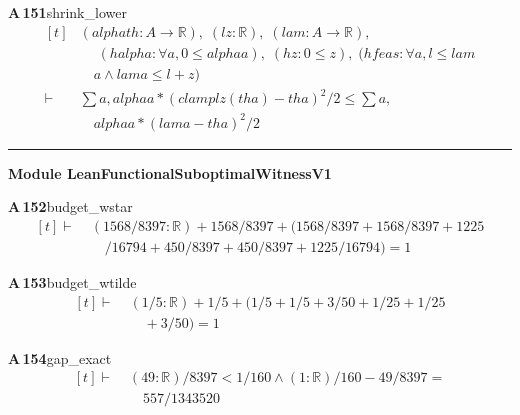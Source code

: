 \documentclass[conference]{IEEEtran}
\theoremstyle{definition}
\newcommand{\lean}[1]{\textsf{\footnotesize #1}}
\begin{document}
\noindent\textbf{A\,151}\quad\lean{shrink\_lower}
{\footnotesize\[ \begin{aligned}[t]
&(\mathit{alpha} \mathit{th} : \mathit{A} \to \mathbb{R} ),\; (\mathit{l} \mathit{z} : \mathbb{R} ),\; (\mathit{lam} : \mathit{A} \to \mathbb{R} ),\\
&\quad \; (\mathit{halpha} : \forall \mathit{a}, 0 \leq \mathit{alpha} \mathit{a}),\; (\mathit{hz} : 0 \leq \mathit{z}),\; (\mathit{hfeas} : \forall \mathit{a}, \mathit{l} \leq \mathit{lam}\\
&\quad \mathit{a} \wedge \mathit{lam} \mathit{a} \leq \mathit{l} + \mathit{z})\\
\vdash\;&\textstyle\sum \mathit{a}, \mathit{alpha} \mathit{a} * (\mathit{clamp} \mathit{l} \mathit{z} (\mathit{th} \mathit{a}) - \mathit{th} \mathit{a}) ^{2} / 2 \leq \textstyle\sum \mathit{a},\\
&\quad \mathit{alpha} \mathit{a} * (\mathit{lam} \mathit{a} - \mathit{th} \mathit{a}) ^{2} / 2
\end{aligned} \]}

\vspace{4pt}\noindent\rule{\columnwidth}{0.4pt}\par\vspace{2pt}
\noindent\textbf{Module \lean{LeanFunctionalSuboptimalWitnessV1}}\par\vspace{3pt}

\noindent\textbf{A\,152}\quad\lean{budget\_wstar}
{\footnotesize\[ \begin{aligned}[t]
\vdash\;&(1568/8397 : \mathbb{R} ) + 1568/8397 + (1568/8397 + 1568/8397 + 1225\\
&\quad /16794 + 450/8397 + 450/8397 + 1225/16794) = 1
\end{aligned} \]}

\noindent\textbf{A\,153}\quad\lean{budget\_wtilde}
{\footnotesize\[ \begin{aligned}[t]
\vdash\;&(1/5 : \mathbb{R} ) + 1/5 + (1/5 + 1/5 + 3/50 + 1/25 + 1/25\\
&\quad + 3/50) = 1
\end{aligned} \]}

\noindent\textbf{A\,154}\quad\lean{gap\_exact}
{\footnotesize\[ \begin{aligned}[t]
\vdash\;&(49:\mathbb{R} )/8397 < 1/160 \wedge (1:\mathbb{R} )/160 - 49/8397 =\\
&\quad 557/1343520
\end{aligned} \]}
\end{document}
